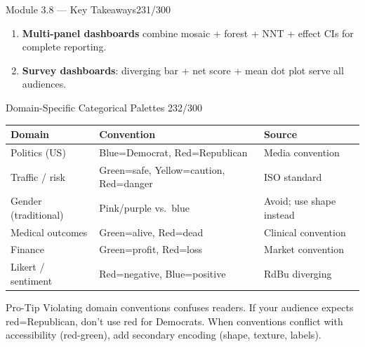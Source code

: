 \documentclass[10pt]{beamer}
\newcommand{\smark}[1]{\hfill{\scriptsize\color{codegray}#1}}
\begin{document}
\begin{frame}{Module 3.8 --- Key Takeaways}\smark{231/300}
\begin{enumerate}
    \item \textbf{Multi-panel dashboards} combine mosaic + forest + NNT + effect CIs for complete reporting.
    \item \textbf{Survey dashboards}: diverging bar + net score + mean dot plot serve all audiences.
    \end{enumerate}
\end{frame}
\begin{frame}{Domain-Specific Categorical Palettes}
\smark{232/300}
\centering\small
\begin{tabular}{@{}lll@{}}
    \toprule
    \textbf{Domain} & \textbf{Convention} & \textbf{Source} \\
    \midrule
    Politics (US)       & Blue=Democrat, Red=Republican      & Media convention \\
    Traffic / risk      & Green=safe, Yellow=caution, Red=danger & ISO standard \\
    Gender (traditional)& Pink/purple vs.\ blue              & Avoid; use shape instead \\
    Medical outcomes    & Green=alive, Red=dead              & Clinical convention \\
    Finance             & Green=profit, Red=loss              & Market convention \\
    Likert / sentiment  & Red=negative, Blue=positive         & RdBu diverging \\
    \bottomrule
\end{tabular}

\vspace{0.3cm}
\begin{alertblock}{Pro-Tip}
    \scriptsize Violating domain conventions confuses readers. If your audience expects red=Republican, don't use red for Democrats. When conventions conflict with accessibility (red-green), add secondary encoding (shape, texture, labels).
\end{alertblock}
\end{frame}
\end{document}
